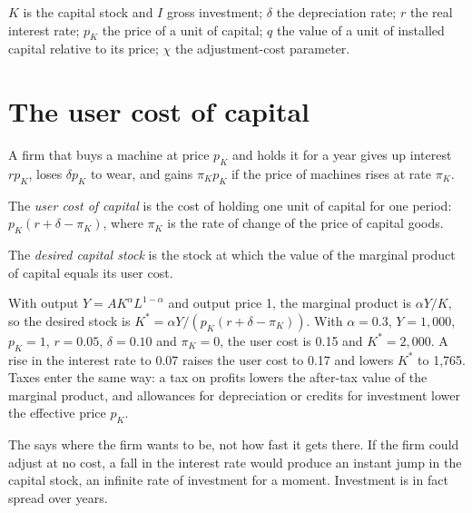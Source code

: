 \begin{notation}\label{not:b2:investment:symbols}
$K$ is the capital stock and $I$ gross investment; $\delta$ the depreciation rate; $r$ the real interest rate; $p_K$ the price of a
unit of capital; $q$ the value of a unit of installed capital relative to its price; $\chi$ the adjustment-cost parameter.
\end{notation}

\section{The user cost of capital}\label{sec:b2:investment:user-cost}

A firm that buys a machine at price $p_K$ and holds it for a year gives up interest $rp_K$, loses $\delta p_K$ to wear, and gains $\pi_K p_K$ if the
price of machines rises at rate $\pi_K$.

\begin{definition}\label{def:b2:investment:user-cost}
The \emph{user cost of capital} is the cost of holding one unit of capital for one period:
$p_K(r + \delta - \pi_K)$, where $\pi_K$ is the rate of change of the price of capital goods.
\end{definition}

\begin{definition}\label{def:b2:investment:desired-capital}
The \emph{desired capital stock} is the stock at which the value of the marginal product of
capital equals its user cost.
\end{definition}

With output $Y = AK^\alpha L^{1-\alpha}$ and output price 1, the marginal product is $\alpha Y/K$, so the desired stock is $K^* = \alpha Y/(p_K(r + \delta - \pi_K))$. With $\alpha = 0.3$, $Y = 1{,}000$, $p_K = 1$,
$r = 0.05$, $\delta = 0.10$ and $\pi_K = 0$, the user cost is 0.15 and $K^* = 2{,}000$. A rise in the interest rate to 0.07 raises the user cost to 0.17 and lowers $K^*$ to 1,765.
Taxes enter the same way: a tax on profits lowers the after-tax value of the marginal product, and allowances for
depreciation or credits for investment lower the effective price $p_K$.

The  says where the firm wants to be, not how fast it gets there. If the firm could adjust at no
cost, a fall in the interest rate would produce an instant jump in the capital stock, an infinite rate of investment for
a moment. Investment is in fact spread over years.

